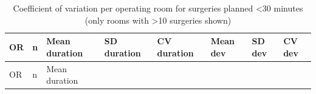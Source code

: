 \documentclass[
]{article}
\begin{document}
\begin{longtable}[]{@{}
  >{\centering\arraybackslash}p{}
  >{\centering\arraybackslash}p{}
  >{\centering\arraybackslash}p{}
  >{\centering\arraybackslash}p{}
  >{\centering\arraybackslash}p{}
  >{\centering\arraybackslash}p{}
  >{\centering\arraybackslash}p{}
  >{\centering\arraybackslash}p{}@{}}
\caption{Coefficient of variation per operating room for surgeries
planned \textless30 minutes (only rooms with \textgreater10 surgeries
shown) \label{tab:cv_room_lt30}}\tabularnewline
\toprule\noalign{}
\begin{minipage}[b]{\linewidth}\centering
OR
\end{minipage} & \begin{minipage}[b]{\linewidth}\centering
n
\end{minipage} & \begin{minipage}[b]{\linewidth}\centering
Mean duration
\end{minipage} & \begin{minipage}[b]{\linewidth}\centering
SD duration
\end{minipage} & \begin{minipage}[b]{\linewidth}\centering
CV duration
\end{minipage} & \begin{minipage}[b]{\linewidth}\centering
Mean dev
\end{minipage} & \begin{minipage}[b]{\linewidth}\centering
SD dev
\end{minipage} & \begin{minipage}[b]{\linewidth}\centering
CV dev
\end{minipage} \\
\midrule\noalign{}
\endfirsthead
\toprule\noalign{}
\begin{minipage}[b]{\linewidth}\centering
OR
\end{minipage} & \begin{minipage}[b]{\linewidth}\centering
n
\end{minipage} & \begin{minipage}[b]{\linewidth}\centering
Mean duration
\end{minipage} & \begin{minipage}[b]{\linewidth}\centering

\end{minipage}
\end{longtable}
\end{document}
